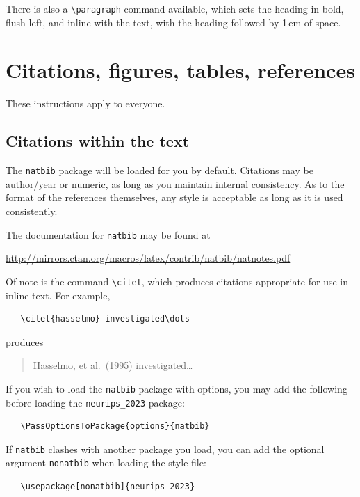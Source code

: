 \documentclass{article}
\begin{document}
There is also a \verb+\paragraph+ command available, which sets the heading in
bold, flush left, and inline with the text, with the heading followed by 1\,em
of space.


\section{Citations, figures, tables, references}
\label{others}


These instructions apply to everyone.


\subsection{Citations within the text}


The \verb+natbib+ package will be loaded for you by default.  Citations may be
author/year or numeric, as long as you maintain internal consistency.  As to the
format of the references themselves, any style is acceptable as long as it is
used consistently.


The documentation for \verb+natbib+ may be found at
\begin{center}
  \url{http://mirrors.ctan.org/macros/latex/contrib/natbib/natnotes.pdf}
\end{center}
Of note is the command \verb+\citet+, which produces citations appropriate for
use in inline text.  For example,
\begin{verbatim}
   \citet{hasselmo} investigated\dots
\end{verbatim}
produces
\begin{quote}
  Hasselmo, et al.\ (1995) investigated\dots
\end{quote}


If you wish to load the \verb+natbib+ package with options, you may add the
following before loading the \verb+neurips_2023+ package:
\begin{verbatim}
   \PassOptionsToPackage{options}{natbib}
\end{verbatim}


If \verb+natbib+ clashes with another package you load, you can add the optional
argument \verb+nonatbib+ when loading the style file:
\begin{verbatim}
   \usepackage[nonatbib]{neurips_2023}
\end{verbatim}
\end{document}
